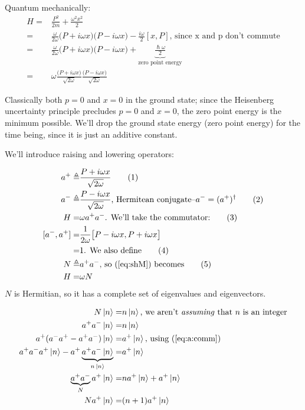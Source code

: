 \documentclass[]{article}
\newcommand\numberthis{\addtocounter{equation}{1}\tag{\theequation}}
\begin{document}
Quantum mechanically:
\begin{align*}
	H =& \frac{P^2}{2m} + \frac{\omega^2 x^2}{2}\\
	=& \frac{\omega}{2 \omega}\big(P + i \omega x \big)\big(P - i \omega x \big) - \frac{i \omega}{2} [x,P] \text{, since x and p don't commute}\\
	=& \frac{\omega}{2 \omega}\big(P + i \omega x \big)\big(P - i \omega x \big) + \underbrace{\frac{\hslash \omega}{2}}_\text{zero point energy}\\
	=&\omega \frac{\big(P + i \omega x \big)}{\sqrt{2 \omega}}\frac{\big(P - i \omega x \big)}{\sqrt{2 \omega}}
\end{align*}

Classically both $p=0$ and $x=0$ in the ground state; since the Heisenberg uncertainty principle precludes  $p=0$ and $x=0$, the zero point energy is the minimum possible. We'll drop the ground state energy (zero point energy) for the time being, since it is just an additive constant.

We'll introduce raising and lowering operators:

\begin{align*}
	a^+ \triangleq & \frac{P + i \omega x } {\sqrt{2 \omega}} \numberthis \label{eq:creation:operator}\\
	a^- \triangleq & \frac{P - i \omega x } {\sqrt{2 \omega}}\text{, Hermitean conjugate--$a^-=(a^+)^\dagger$} \numberthis \label{eq:annihilation:operator}\\
	H =& \omega a^+ a^-\text{. We'll take the commutator:}\numberthis \label{eq:shM}\\
	[a^-,a^+] =& \frac{1}{2\omega}\big[P - i \omega x,P + i \omega x\big]\\
	=& 1\text{. We also define} \numberthis \label{eq:a:comm}\\
	N \triangleq& a^+a^-\text{, so (\ref{eq:shM}) becomes} \numberthis \label{eq:number:operator}\\
	H =& \omega N
\end{align*}
$N$ is Hermitian, so it has a complete set of eigenvalues and eigenvectors.

\begin{align*}
	N\ket{n} =& n\ket{n} \text{, we aren't \emph{assuming} that $n$ is an integer}\\
	a^+a^-\ket{n} =& n\ket{n}\\
	a^+(a^-a^+ - a^+a^-)\ket{n} =& a^+\ket{n}\text{, using (\ref{eq:a:comm})}\\
	a^+a^-a^+ \ket{n} - a^+\underbrace{a^+a^- \ket{n}}_\text{$ n\ket{n}$} =& a^+\ket{n}\\
	\underbrace{a^+a^-}_\text{$N$}a^+ \ket{n} =& n a^+\ket{n} + a^+\ket{n}\\
	N a^+ \ket{n} =& (n+1) a^+ \ket{n}
\end{align*}
\end{document}
